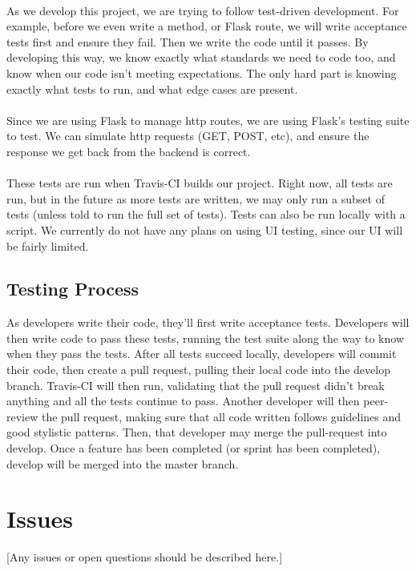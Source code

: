 \documentclass[12pt,oneside,letterpaper]{article}
\begin{document}
\paragraph{} As we develop this project, we are trying to follow test-driven development. For example, before we even write a method, or Flask route, we will write acceptance tests first and ensure they fail. Then we write the code until it passes. By developing this way, we know exactly what standards we need to code too, and know when our code isn't meeting expectations. The only hard part is knowing exactly what tests to run, and what edge cases are present.
\paragraph{} Since we are using Flask to manage http routes, we are using Flask's testing suite to test. We can simulate http requests (GET, POST, etc), and ensure the response we get back from the backend is correct.
\paragraph{} These tests are run when Travis-CI builds our project. Right now, all tests are run, but in the future as more tests are written, we may only run a subset of tests (unless told to run the full set of tests). Tests can also be run locally with a script. We currently do not have any plans on using UI testing, since our UI will be fairly limited.

\subsection{Testing Process}
As developers write their code, they'll first write acceptance tests. Developers will then write code to pass these tests, running the test suite along the way to know when they pass the tests. After all tests succeed locally, developers will commit their code, then create a pull request, pulling their local code into the develop branch. Travis-CI will then run, validating that the pull request didn't break anything and all the tests continue to pass. Another developer will then peer-review the pull request, making sure that all code written follows guidelines and good stylistic patterns. Then, that developer may merge the pull-request into develop. Once a feature has been completed (or sprint has been completed), develop will be merged into the master branch.

\section{Issues}
[Any issues or open questions should be described here.]
\end{document}
